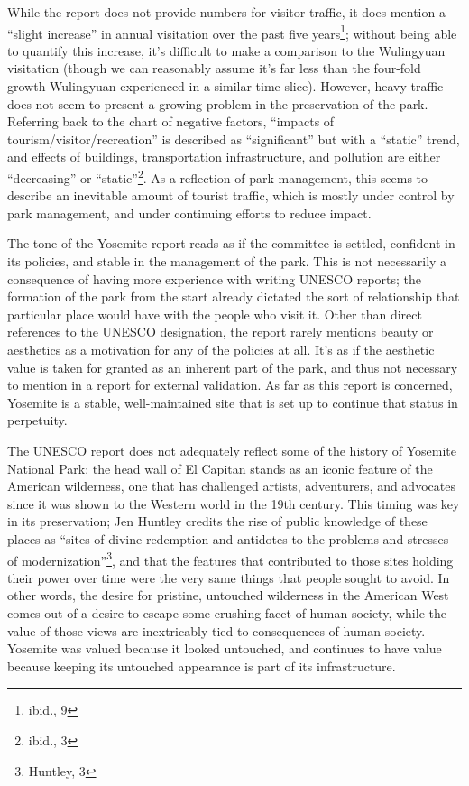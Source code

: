 While the report does not provide numbers for visitor traffic, it does mention a
``slight increase'' in annual visitation over the past five
years\footnote{ibid., 9}; without being able to quantify this increase, it's
difficult to make a comparison to the Wulingyuan visitation (though we can
reasonably assume it's far less than the four-fold growth Wulingyuan experienced
in a similar time slice). However, heavy traffic does not seem to present a
growing problem in the preservation of the park. Referring back to the chart of
negative factors, ``impacts of tourism/visitor/recreation'' is described as
``significant'' but with a ``static'' trend, and effects of buildings,
transportation infrastructure, and pollution are either ``decreasing'' or
``static''\footnote{ibid., 3}. As a reflection of park management, this seems to
describe an inevitable amount of tourist traffic, which is mostly under control
by park management, and under continuing efforts to reduce impact.

The tone of the Yosemite report reads as if the committee is settled, confident
in its policies, and stable in the management of the park. This is not
necessarily a consequence of having more experience with writing UNESCO reports;
the formation of the park from the start already dictated the sort of
relationship that particular place would have with the people who visit it.
Other than direct references to the UNESCO designation, the report rarely
mentions beauty or aesthetics as a motivation for any of the policies at all.
It's as if the aesthetic value is taken for granted as an inherent part of the
park, and thus not necessary to mention in a report for external validation. As
far as this report is concerned, Yosemite is a stable, well-maintained site that
is set up to continue that status in perpetuity.

The UNESCO report does not adequately reflect some of the history of Yosemite
National Park; the head wall of El Capitan stands as an iconic feature of the
American wilderness, one that has challenged artists, adventurers, and advocates
since it was shown to the Western world in the 19th century. This timing was key
in its preservation; Jen Huntley credits the rise of public knowledge of these
places as ``sites of divine redemption and antidotes to the problems and
stresses of modernization''\footnote{Huntley, 3}, and that the features that
contributed to those sites holding their power over time were the very same
things that people sought to avoid. In other words, the desire for pristine,
untouched wilderness in the American West comes out of a desire to escape some
crushing facet of human society, while the value of those views are inextricably
tied to consequences of human society. Yosemite was valued because it looked
untouched, and continues to have value because keeping its untouched appearance
is part of its infrastructure.

